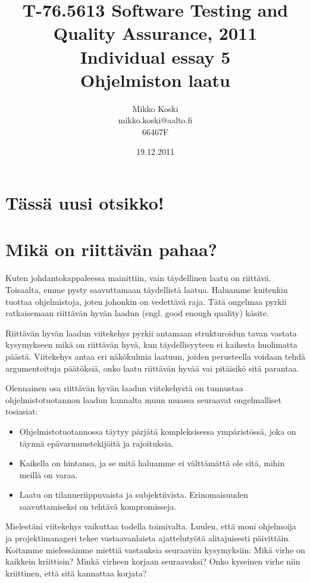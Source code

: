\documentclass[a4paper]{article}
\begin{document}
\title{\small T-76.5613 Software Testing and Quality Assurance, 2011 \\ Individual essay 5 \\ \huge Ohjelmiston laatu}
\date{19.12.2011}
\author{Mikko Koski \\ mikko.koski@aalto.fi \\ 66467F}
\maketitle

\large

\section{Tässä uusi otsikko!}

\section{Mikä on riittävän pahaa?}

Kuten johdantokappaleessa mainittiin, vain täydellinen laatu on riittävä. Toisaalta, emme pysty saavuttamaan täydellistä laatua. Haluamme kuitenkin tuottaa ohjelmistoja, joten johonkin on vedettävä raja. Tätä ongelmaa pyrkii ratkaisemaan riittävän hyvän laadun (engl. good enough quality) käsite.

Riittävän hyvän laadun viitekehys pyrkii antamaan strukturoidun tavan vastata kysymykseen mikä on riittävän hyvä, kun täydellisyyteen ei kaikesta huolimatta päästä. Viitekehys antaa eri näkökulmia laatuun, joiden perusteella voidaan tehdä argumentoituja päätöksiä, onko laatu riittävän hyvää vai pitäisikö sitä parantaa. \citet{bach1997}

Olennainen osa riittävän hyvän laadun viitekehystä on tunnustaa ohjelmistotuotannon laadun kannalta muun muassa seuraavat ongelmalliset tosiasiat: 

\begin{itemize}
\item Ohjelmistotuotannossa täytyy pärjätä kompleksisessa ympäristössä, joka on täynnä epävarmuustekijöitä ja rajoituksia. 
\item Kaikella on hintansa, ja se mitä haluamme ei välttämättä ole sitä, mihin meillä on varaa. 
\item Laatu on tilanneriippuvaista ja subjektiivista. Erinomaisuuden saavuttamiseksi on tehtävä kompromisseja.
\end{itemize}

Mielestäni viitekehys vaikuttaa todella toimivalta. Luulen, että moni ohjelmoija ja projektimanageri tekee vastaavanlaista ajattelutyötä alitajuisesti päivittäin. Koitamme mielessämme miettiä vastauksia seuraaviin kysymyksiin: Mikä virhe on kaikkein kriittisin? Minkä virheen korjaan seuraavaksi? Onko kyseinen virhe niin kriittinen, että sitä kannattaa korjata?
\end{document}
